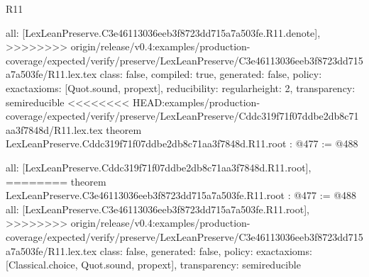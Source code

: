 \begin{lexlean}{R11}
\begin{coremodule}
{{{{{  all: [LexLeanPreserve.C3e46113036eeb3f8723dd715a7a503fe.R11.denote],
>>>>>>>> origin/release/v0.4:examples/production-coverage/expected/verify/preserve/LexLeanPreserve/C3e46113036eeb3f8723dd715a7a503fe/R11.lex.tex
  class: false,
  compiled: true,
  generated: false,
  policy: exact{axioms: [Quot.sound, propext]},
  reducibility: regular{height: 2},
  transparency: semireducible
}
<<<<<<<< HEAD:examples/production-coverage/expected/verify/preserve/LexLeanPreserve/Cddc319f71f07ddbe2db8c71aa3f7848d/R11.lex.tex
theorem LexLeanPreserve.Cddc319f71f07ddbe2db8c71aa3f7848d.R11.root : @477 := @488 {
  all: [LexLeanPreserve.Cddc319f71f07ddbe2db8c71aa3f7848d.R11.root],
========
theorem LexLeanPreserve.C3e46113036eeb3f8723dd715a7a503fe.R11.root : @477 := @488 {
  all: [LexLeanPreserve.C3e46113036eeb3f8723dd715a7a503fe.R11.root],
>>>>>>>> origin/release/v0.4:examples/production-coverage/expected/verify/preserve/LexLeanPreserve/C3e46113036eeb3f8723dd715a7a503fe/R11.lex.tex
  class: false,
  generated: false,
  policy: exact{axioms: [Classical.choice, Quot.sound, propext]},
  transparency: semireducible
}

}}}}}
\end{coremodule}
\end{lexlean}
